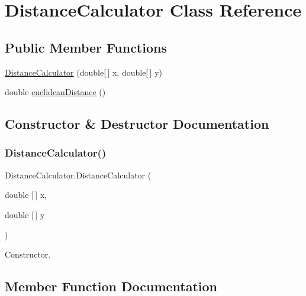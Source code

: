 \hypertarget{class_distance_calculator}{}\section{Distance\+Calculator Class Reference}
\label{class_distance_calculator}
\subsection*{Public Member Functions}
\begin{DoxyCompactItemize}
\item 
\hyperlink{class_distance_calculator_ae6b67de32de1395ecc45d421108b5763}{Distance\+Calculator} (double\mbox{[}$\,$\mbox{]} x, double\mbox{[}$\,$\mbox{]} y)
\item 
double \hyperlink{class_distance_calculator_a1530ee476e59d1da8e59876c16a03f55}{euclidean\+Distance} ()
\end{DoxyCompactItemize}


\subsection{Constructor \& Destructor Documentation}
\mbox{\label{class_distance_calculator_ae6b67de32de1395ecc45d421108b5763}} 
\subsubsection{\texorpdfstring{Distance\+Calculator()}{DistanceCalculator()}}
{\footnotesize\ttfamily Distance\+Calculator.\+Distance\+Calculator (\begin{DoxyParamCaption}\item[{double \mbox{[}$\,$\mbox{]}}]{x,  }\item[{double \mbox{[}$\,$\mbox{]}}]{y }\end{DoxyParamCaption})}

Constructor. 

\subsection{Member Function Documentation}
\mbox{\label{class_distance_calculator_a1530ee476e59d1da8e59876c16a03f55}} 

